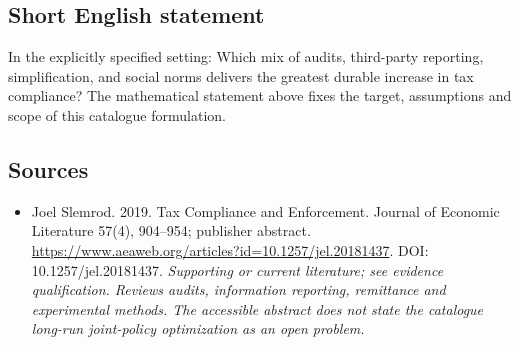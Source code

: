 \documentclass[11pt]{article}
\begin{document}
\subsection{Short English statement}
In the explicitly specified setting: Which mix of audits, third-party reporting, simplification, and social norms delivers the greatest durable increase in tax compliance? The mathematical statement above fixes the target, assumptions and scope of this catalogue formulation.

\subsection{Sources}
\begin{itemize}\raggedright
\item[\textnormal{[S1]}]\hypertarget{source:30007759:1}{} Joel Slemrod. 2019. Tax Compliance and Enforcement. Journal of Economic Literature 57(4), 904–954; publisher abstract.
\url{https://www.aeaweb.org/articles?id=10.1257/jel.20181437}.
DOI: 10.1257/jel.20181437.
{\small\textit{Supporting or current literature; see evidence qualification. Reviews audits, information reporting, remittance and experimental methods. The accessible abstract does not state the catalogue long-run joint-policy optimization as an open problem.}}
\end{itemize}
\end{document}
